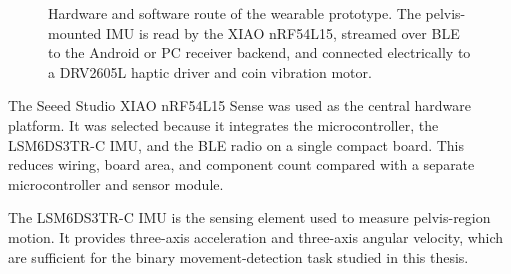 \begin{figure}[!tbp]
    \centering
    \caption{Hardware and software route of the wearable prototype. The pelvis-mounted IMU is read by the XIAO nRF54L15, streamed over BLE to the Android or PC receiver backend, and connected electrically to a DRV2605L haptic driver and coin vibration motor.}
    \label{fig:system_architecture}
\end{figure}

The Seeed Studio XIAO nRF54L15 Sense was used as the central hardware platform. It was selected because it integrates the microcontroller, the LSM6DS3TR-C IMU, and the BLE radio on a single compact board. This reduces wiring, board area, and component count compared with a separate microcontroller and sensor module.

The LSM6DS3TR-C IMU is the sensing element used to measure pelvis-region motion. It provides three-axis acceleration and three-axis angular velocity, which are sufficient for the binary movement-detection task studied in this thesis.

